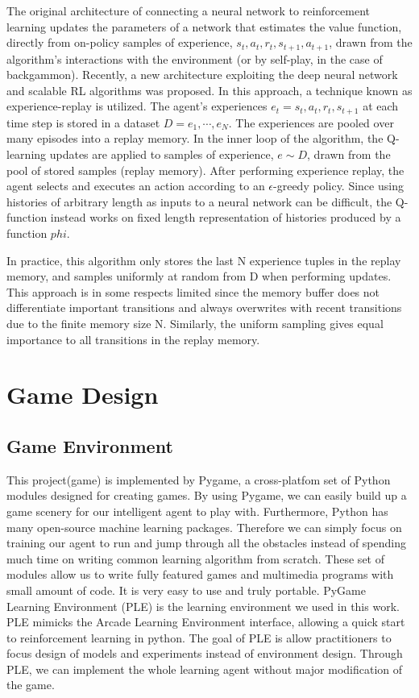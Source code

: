 \documentclass{acmsiggraph}
\begin{document}
The original architecture of connecting a neural network to reinforcement learning updates the parameters of a network that estimates the value function, directly from on-policy samples of experience, $s_t, a_t, r_t, s_{t+1}, a_{t+1}$, drawn from the algorithm’s interactions with the environment (or by self-play, in the case of backgammon). Recently, a new architecture exploiting the deep neural network and scalable RL algorithms was proposed. In this approach, a technique known as experience-replay is utilized. The agent's experiences $e_t={s_t, a_t, r_t, s_{t+1}}$ at each time step is stored in a dataset $D={e_1, \cdots, e_N}$. The experiences are pooled over many episodes into a replay memory. In the inner loop of the algorithm, the Q-learning updates are applied to samples of experience, $e \sim D$, drawn from the pool of stored samples (replay memory). After performing experience replay,
the agent selects and executes an action according to an $\epsilon$-greedy policy. Since using histories of arbitrary length as inputs to a neural network can be difficult, the Q-function instead works on fixed length representation of histories produced by a function $phi$. 

In practice, this algorithm only stores the last N experience tuples in the replay memory, and samples uniformly at random from D when performing updates. This approach is in some respects limited since the memory buffer does not differentiate important transitions and always overwrites with recent transitions due to the finite memory size N. Similarly, the uniform sampling gives equal importance to all transitions in the replay memory. 


\section{Game Design}
\subsection{Game Environment} 
This project(game) is implemented by Pygame, a cross-platfom set of Python modules designed for creating games. By using Pygame, we can easily build up a game scenery for our intelligent agent to play with. Furthermore, Python has many open-source machine learning packages. Therefore we can simply focus on training our agent to run and jump through all the obstacles instead of spending much time on writing common learning algorithm from scratch. These set of modules allow us to write fully featured games and multimedia programs with small amount of code. It is very easy to use and truly portable. PyGame Learning Environment (PLE) is the learning environment we used in this work. PLE mimicks the Arcade Learning Environment \cite{bellemare13arcade} interface, allowing a quick start to reinforcement learning in python. The goal of PLE is allow practitioners to focus design of models and experiments instead of environment design. Through PLE, we can implement the whole learning agent without major modification of the game.
\end{document}
